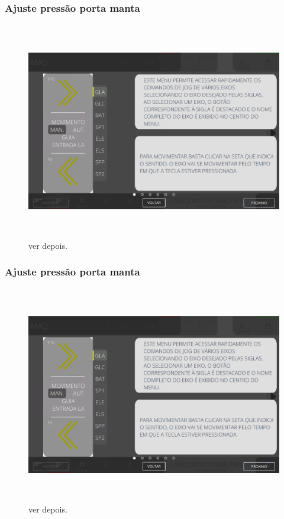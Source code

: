 \newpage
\thispagestyle{fancy}
\vspace*{\fill}
\subsubsection{\small{Ajuste pressão porta manta}}
\begin{figure}[h]
  \centering
  \includegraphics[width=576px,height=360px]{src/images/08-count/commands/e-1.png}
  \caption{ver depois.}
   \label{}
\end{figure}
\vspace*{\fill}

\newpage
\thispagestyle{fancy}
\vspace*{\fill}
\subsubsection{\small{Ajuste pressão porta manta}}
\begin{figure}[h]
  \centering
  \includegraphics[width=576px,height=360px]{src/images/08-count/commands/e-1.png}
  \caption{ver depois.}
   \label{}
\end{figure}
\vspace*{\fill}